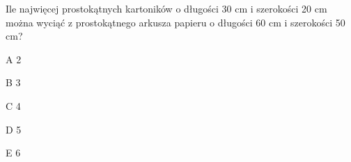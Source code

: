 \begin{tresc}
Ile najwięcej prostokątnych kartoników o długości 30 cm i szerokości 20 cm można wyciąć z prostokątnego arkusza papieru o długości 60 cm i szerokości 50 cm?
\end{tresc}
\begin{wariant}{A} 2 \end{wariant}
\begin{wariant}{B} 3 \end{wariant}
\begin{wariant}{C} 4 \end{wariant}
\begin{wariant}{D} 5 \end{wariant}
\begin{wariant}{E} 6 \end{wariant}
